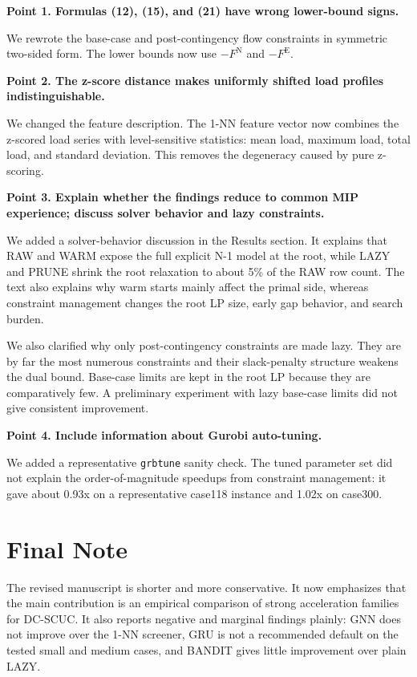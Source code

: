 \documentclass[11pt,a4paper]{article}
\begin{document}
\textbf{Point 1. Formulas (12), (15), and (21) have wrong lower-bound signs.}

We rewrote the base-case and post-contingency flow constraints in symmetric two-sided form. The lower bounds now use $-F^{\mathrm{N}}$ and $-F^{\mathrm{E}}$.

\textbf{Point 2. The z-score distance makes uniformly shifted load profiles indistinguishable.}

We changed the feature description. The 1-NN feature vector now combines the z-scored load series with level-sensitive statistics: mean load, maximum load, total load, and standard deviation. This removes the degeneracy caused by pure z-scoring.

\textbf{Point 3. Explain whether the findings reduce to common MIP experience; discuss solver behavior and lazy constraints.}

We added a solver-behavior discussion in the Results section. It explains that RAW and WARM expose the full explicit N-1 model at the root, while LAZY and PRUNE shrink the root relaxation to about 5\% of the RAW row count. The text also explains why warm starts mainly affect the primal side, whereas constraint management changes the root LP size, early gap behavior, and search burden.

We also clarified why only post-contingency constraints are made lazy. They are by far the most numerous constraints and their slack-penalty structure weakens the dual bound. Base-case limits are kept in the root LP because they are comparatively few. A preliminary experiment with lazy base-case limits did not give consistent improvement.

\textbf{Point 4. Include information about Gurobi auto-tuning.}

We added a representative \texttt{grbtune} sanity check. The tuned parameter set did not explain the order-of-magnitude speedups from constraint management: it gave about 0.93x on a representative case118 instance and 1.02x on case300.

\section*{Final Note}

The revised manuscript is shorter and more conservative. It now emphasizes that the main contribution is an empirical comparison of strong acceleration families for DC-SCUC. It also reports negative and marginal findings plainly: GNN does not improve over the 1-NN screener, GRU is not a recommended default on the tested small and medium cases, and BANDIT gives little improvement over plain LAZY.
\end{document}
